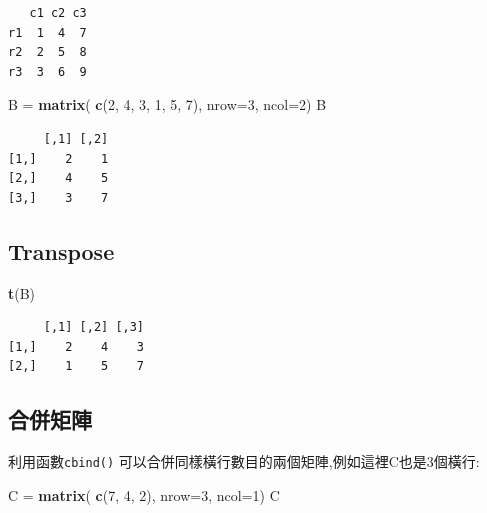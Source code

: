\documentclass[]{book}
\newenvironment{Shaded}{\begin{snugshade}}{\end{snugshade}}
\newcommand{\DataTypeTok}[1]{\textcolor[rgb]{0.13,0.29,0.53}{#1}}
\newcommand{\DecValTok}[1]{\textcolor[rgb]{0.00,0.00,0.81}{#1}}
\newcommand{\KeywordTok}[1]{\textcolor[rgb]{0.13,0.29,0.53}{\textbf{#1}}}
\newcommand{\NormalTok}[1]{#1}
\newcommand{\StringTok}[1]{\textcolor[rgb]{0.31,0.60,0.02}{#1}}
\theoremstyle{definition}
\theoremstyle{definition}
\theoremstyle{definition}
\theoremstyle{remark}
\begin{document}
\begin{verbatim}
   c1 c2 c3
r1  1  4  7
r2  2  5  8
r3  3  6  9
\end{verbatim}

\begin{Shaded}
\begin{Highlighting}[]
\NormalTok{ B =}\StringTok{ }\KeywordTok{matrix}\NormalTok{( }
    \KeywordTok{c}\NormalTok{(}\DecValTok{2}\NormalTok{, }\DecValTok{4}\NormalTok{, }\DecValTok{3}\NormalTok{, }\DecValTok{1}\NormalTok{, }\DecValTok{5}\NormalTok{, }\DecValTok{7}\NormalTok{), }
    \DataTypeTok{nrow=}\DecValTok{3}\NormalTok{, }
    \DataTypeTok{ncol=}\DecValTok{2}\NormalTok{) }
\NormalTok{B}
\end{Highlighting}
\end{Shaded}

\begin{verbatim}
     [,1] [,2]
[1,]    2    1
[2,]    4    5
[3,]    3    7
\end{verbatim}

\hypertarget{transpose}{%
\subsection{Transpose}\label{transpose}}

\begin{Shaded}
\begin{Highlighting}[]
\KeywordTok{t}\NormalTok{(B)}
\end{Highlighting}
\end{Shaded}

\begin{verbatim}
     [,1] [,2] [,3]
[1,]    2    4    3
[2,]    1    5    7
\end{verbatim}

\subsection{合併矩陣}

利用函數\texttt{cbind()}
可以合併同樣橫行數目的兩個矩陣,例如這裡C也是3個橫行:

\begin{Shaded}
\begin{Highlighting}[]
\NormalTok{C =}\StringTok{ }\KeywordTok{matrix}\NormalTok{( }
   \KeywordTok{c}\NormalTok{(}\DecValTok{7}\NormalTok{, }\DecValTok{4}\NormalTok{, }\DecValTok{2}\NormalTok{), }
   \DataTypeTok{nrow=}\DecValTok{3}\NormalTok{, }
   \DataTypeTok{ncol=}\DecValTok{1}\NormalTok{) }
\NormalTok{C}
\end{Highlighting}
\end{Shaded}
\end{document}
